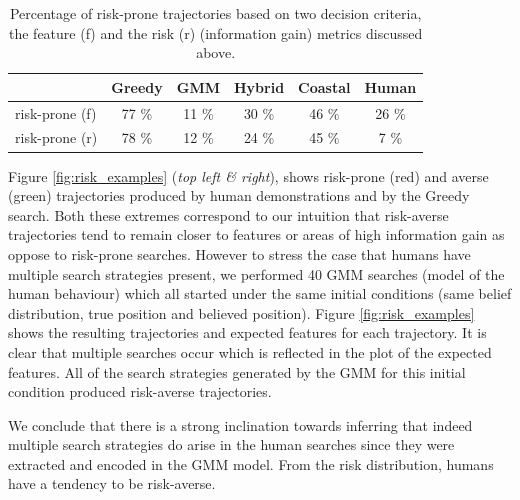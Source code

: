 \begin{table}
\centering
 \begin{tabular}{l|c|c|c|c|c|}
                 &  Greedy & GMM   & Hybrid & Coastal & Human \\ \hline
  risk-prone (f) &   77 \% & 11 \% &  30 \% & 46 \% & 26  \% \\ \hline
  risk-prone (r) &   78 \% & 12 \% &  24 \% & 45 \% &  7 \% \\ \hline
 \end{tabular}
 \caption{Percentage of risk-prone trajectories based on two decision criteria, the feature (f) and the risk (r) (information gain) metrics discussed above.}
 \label{tab:percentage-risk-prone}
\end{table}



Figure \ref{fig:risk_examples} (\textit{top left \& right}), shows risk-prone (red) and 
averse (green) trajectories produced by human demonstrations and by the Greedy search. Both these extremes
correspond to our intuition that risk-averse trajectories tend to remain closer to features or areas of high information gain
as oppose to risk-prone searches. However to stress the case that humans have multiple search strategies 
present, we performed 40 GMM searches (model of the human behaviour) which all started under the same initial conditions
(same belief distribution, true position and believed position). Figure \ref{fig:risk_examples}
shows the resulting trajectories and expected features for each trajectory. 
It is clear that multiple searches occur which is reflected in the plot of the expected features. All of the 
search strategies generated by the GMM for this initial condition produced risk-averse trajectories.


We conclude that there is a strong inclination towards inferring that indeed multiple search strategies do 
arise in the human searches since they were extracted and encoded in the GMM model. From the risk distribution, humans have a 
tendency to be risk-averse.

